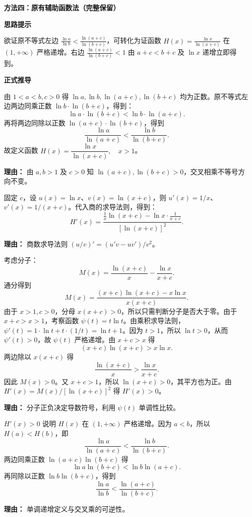 \noindent\textbf{方法四：原有辅助函数法（完整保留）}
\begin{proofbox}
	\textbf{\textcolor{CProof}{思路提示}}

	欲证原不等式左边 $\frac{\ln a}{\ln b}<\frac{\ln(a+c)}{\ln(b+c)}$，可转化为证函数 $H(x)=\frac{\ln x}{\ln(x+c)}$ 在 $(1,+\infty)$ 严格递增。右边 $\frac{\ln(a+c)}{\ln(b+c)}<1$ 由 $a+c<b+c$ 及 $\ln x$ 递增立即得到。

	\medskip
	\textbf{\textcolor{CProof}{正式推导}}
	\begin{description}[style=nextline, leftmargin=2.8em, labelsep=0.5em, itemsep=0.55em]
		\item[\textbf{步骤一（等价变形）：}] 由 $1<a<b,c>0$ 得 $\ln a,\ln b,\ln(a+c),\ln(b+c)$ 均为正数。原不等式左边两边同乘正数 $\ln b\cdot\ln(b+c)$，得到：
			\[
				\ln a\cdot\ln(b+c)<\ln b\cdot\ln(a+c).
			\]
			再将两边同除以正数 $\ln(a+c)\cdot\ln(b+c)$，得到
			\[
				\frac{\ln a}{\ln(a+c)}<\frac{\ln b}{\ln(b+c)}.
			\]
			故定义函数 $H(x)=\dfrac{\ln x}{\ln(x+c)},\quad x>1$。
			\par\textbf{理由：} 由 $a,b>1$ 及 $c>0$ 知 $\ln(a+c),\ln(b+c)>0$，交叉相乘不等号方向不变。

		\item[\textbf{步骤二（求导）：}] 固定 $c$，设 $u(x)=\ln x$、$v(x)=\ln(x+c)$，则 $u'(x)=1/x$、$v'(x)=1/(x+c)$。代入商的求导法则，得到：
			\[
				H'(x)=\frac{\frac{1}{x}\ln(x+c)-\ln x\cdot\frac{1}{x+c}}{[\ln(x+c)]^{2}}.
			\]
			\par\textbf{理由：} 商数求导法则 $(u/v)'=(u'v-uv')/v^{2}$。

		\item[\textbf{步骤三（判号）：}] 考虑分子：
			\[
				M(x)=\frac{\ln(x+c)}{x}-\frac{\ln x}{x+c}.
			\]
			通分得到
\[
M(x)=\frac{(x+c)\ln(x+c)-x\ln x}{x(x+c)}.
\]
由于 $x>1,c>0$，分母 $x(x+c)>0$，所以只需判断分子是否大于零。由于 $x+c>x>1$，考察函数 $\psi(t)=t\ln t$。由乘积求导法则，$\psi'(t)=1\cdot\ln t+t\cdot(1/t)=\ln t+1$。因为 $t>1$，所以 $\ln t>0$，从而 $\psi'(t)>0$，故 $\psi(t)$ 严格递增。由 $x+c>x$ 得
			\[
				(x+c)\ln(x+c)>x\ln x.
			\]
			两边除以 $x(x+c)$ 得
			\[
				\frac{\ln(x+c)}{x}>\frac{\ln x}{x+c}.
			\]
			因此 $M(x)>0$。又 $x+c>1$，所以 $\ln(x+c)>0$，其平方也为正。由 $H'(x)=M(x)/[\ln(x+c)]^2$ 得 $H'(x)>0$。
			\par\textbf{理由：} 分子正负决定导数符号，利用 $\psi(t)$ 单调性比较。

		\item[\textbf{步骤四（单调性应用）：}] $H'(x)>0$ 说明 $H(x)$ 在 $(1,+\infty)$ 严格递增。因为 $a<b$，所以 $H(a)<H(b)$，即
			\[
				\frac{\ln a}{\ln(a+c)}<\frac{\ln b}{\ln(b+c)}.
			\]
			两边同乘正数 $\ln(a+c)\ln(b+c)$ 得
\[\ln a\ln(b+c)<\ln b\ln(a+c).\]
再同除以正数 $\ln b\ln(b+c)$，得到
			\[
				\frac{\ln a}{\ln b}<\frac{\ln(a+c)}{\ln(b+c)}.
			\]
			\par\textbf{理由：} 单调递增定义与交叉乘的可逆性。


\end{description}
\end{proofbox}
